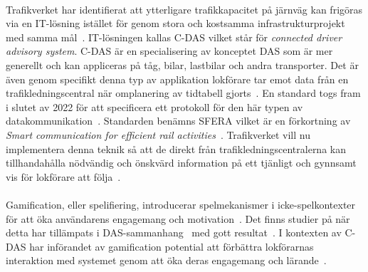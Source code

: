 \paragraph{}
\hspace{-16pt}
Trafikverket har identifierat att ytterligare trafikkapacitet på järnväg kan frigöras via en IT-lösning istället för genom stora och kostsamma infrastrukturprojekt med samma mål~\cite{Lindmark2022}.
IT-lösningen kallas C-DAS vilket står för \emph{connected driver advisory system}.
C-DAS är en specialisering av konceptet DAS som är mer generellt och kan appliceras på tåg, bilar, lastbilar och andra transporter.
Det är även genom specifikt denna typ av applikation lokförare tar emot data från en trafikledningscentral när omplanering av tidtabell gjorts~\cite{Joborn2023, IRS90940}.
En standard togs fram i slutet av 2022 för att specificera ett protokoll för den här typen av datakommunikation~\cite{IRS90940}.
Standarden benämns SFERA vilket är en förkortning av \emph{Smart communication for efficient rail activities}~\cite{IRS90940}.
Trafikverket vill nu implementera denna teknik så att de direkt från trafikledningscentralerna kan tillhandahålla nödvändig och önskvärd information på ett tjänligt och gynnsamt vis för lokförare att följa~\cite{Angel2020, Joborn2023, Lindmark2022}.
\paragraph{}
\hspace{-16pt}
Gamification, eller spelifiering, introducerar spelmekanismer i icke-spelkontexter för att öka användarens engagemang och motivation~\cite{Cwil2018, Bae2014}.
Det finns studier på när detta har tillämpats i DAS-sammanhang~\cite{Bae2014} med gott resultat~\cite{Cwil2018}.
I kontexten av C-DAS har införandet av gamification potential att förbättra lokförarnas interaktion med systemet genom att öka deras engagemang och lärande~\cite{Cwil2018, Bae2014}.
